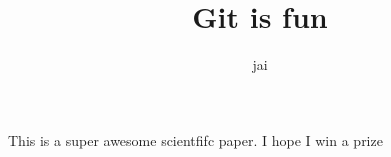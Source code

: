\documentclass[10pt]{article}
\author{jai}
\title{Git is fun}
\begin{document}
        \maketitle
      
        This is a super awesome scientfifc paper.
        I hope I win a prize
\end{document}
